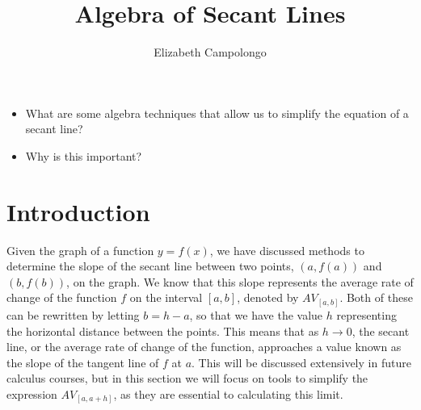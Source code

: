 \documentclass{ximera}
\author{Elizabeth Campolongo}
\title{Algebra of Secant Lines}
\begin{document}
\begin{abstract}
  
\end{abstract}
\maketitle



\begin{motivatingQuestions}\begin{itemize}
\item What are some algebra techniques that allow us to simplify the equation of a secant line?
\item Why is this important?
\end{itemize}\end{motivatingQuestions}



\section{Introduction}

Given the graph of a function $y = f(x)$, we have discussed methods to determine the slope of the secant line between two points, $(a,f(a))$ and $(b,f(b))$, on the graph. We know that this slope represents the average rate of change of the function $f$ on the interval $[a,b]$, denoted by $AV_{[a,b]}$. Both of these can be rewritten by letting $b = h-a$, so that we have the value $h$ representing the horizontal distance between the points. This means that as $h\rightarrow 0$, the secant line, or the average rate of change of the function, approaches a value known as the slope of the tangent line of $f$ at $a$. This will be discussed extensively in future calculus courses, but in this section we will focus on tools to simplify the expression $AV_{[a,a+h]}$, as they are essential to calculating this limit.
\end{document}
